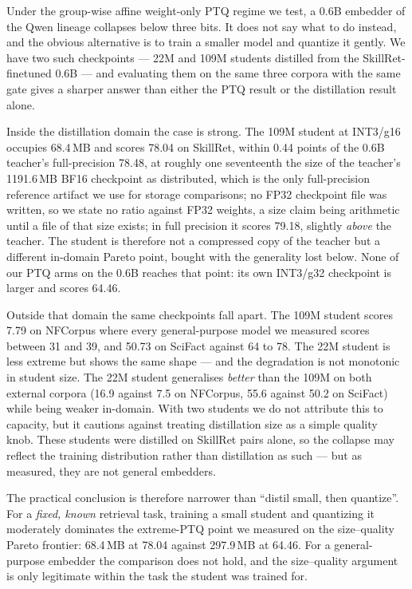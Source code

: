 \documentclass[11pt]{article}
\begin{document}
Under the group-wise affine weight-only PTQ regime we test, a 0.6B embedder of the
Qwen lineage collapses below three bits. It does not say
what to do instead, and the obvious alternative is to train a smaller model and quantize it
gently. We have two such checkpoints --- 22M and 109M students distilled from the
SkillRet-finetuned 0.6B --- and evaluating them on the same three corpora with the same gate
gives a sharper answer than either the PTQ result or the distillation result alone.



Inside the distillation domain the case is strong. The 109M student at INT3/g16 occupies
68.4\,MB and scores 78.04 on SkillRet, within 0.44 points of the 0.6B teacher's
full-precision 78.48, at roughly one seventeenth the size of the teacher's 1191.6\,MB BF16
checkpoint as distributed, which is the only full-precision reference artifact we use for
storage comparisons; no FP32 checkpoint file was written, so we state no ratio against FP32
weights, a size claim being arithmetic until a file of that size exists; in full precision it scores 79.18,
slightly \emph{above} the teacher. The student is therefore not a compressed copy of the
teacher but a different in-domain Pareto point, bought with the generality lost below. None of our PTQ arms on the 0.6B reaches that
point: its own INT3/g32 checkpoint is larger and scores 64.46.

Outside that domain the same checkpoints fall apart. The 109M student scores 7.79 on NFCorpus
where every general-purpose model we measured scores between 31 and 39, and 50.73 on SciFact
against 64 to 78. The 22M student is less extreme but shows the same shape --- and the degradation is not
monotonic in student size. The 22M student generalises \emph{better} than the 109M on both
external corpora (16.9 against 7.5 on NFCorpus, 55.6 against 50.2 on SciFact) while being
weaker in-domain. With two students we do not attribute this to capacity, but it cautions
against treating distillation size as a simple quality knob. These students
were distilled on SkillRet pairs alone, so the collapse may reflect the training distribution
rather than distillation as such --- but as measured, they are not general embedders.

The practical conclusion is therefore narrower than ``distil small, then quantize''. For a
\emph{fixed, known} retrieval task, training a small student and quantizing it moderately
dominates the extreme-PTQ point we measured on the size--quality Pareto frontier: 68.4\,MB at
78.04 against 297.9\,MB at 64.46. For a general-purpose embedder the
comparison does not hold, and the size--quality argument is only legitimate within the task
the student was trained for.
\end{document}
